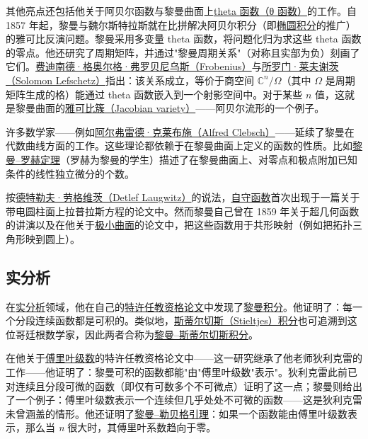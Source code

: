 其他亮点还包括他关于阿贝尔函数与黎曼曲面上\href{https://en.wikipedia.org/wiki/Theta_functions}{theta 函数（θ 函数）}的工作。自 1857 年起，黎曼与魏尔斯特拉斯就在比拼解决阿贝尔积分（即\href{https://en.wikipedia.org/wiki/Elliptic_integrals}{椭圆积分}的推广）的雅可比反演问题。黎曼采用多变量 theta 函数，将问题化归为求这些 theta 函数的零点。他还研究了周期矩阵，并通过"黎曼周期关系"（对称且实部为负）刻画了它们。\href{https://en.wikipedia.org/wiki/Ferdinand_Georg_Frobenius}{费迪南德·格奥尔格·弗罗贝尼乌斯（Frobenius）}与\href{https://en.wikipedia.org/wiki/Solomon_Lefschetz}{所罗门·莱夫谢茨（Solomon Lefschetz）}指出：该关系成立，等价于商空间 {{\(\mathbb{C}^{n}/\Omega\)}{}}（其中 {{\(\Omega\)}{}} 是周期矩阵生成的格）能通过 theta 函数嵌入到一个射影空间中。对于某些 {{\(n\)}{}} 值，这就是黎曼曲面的\href{https://en.wikipedia.org/wiki/Jacobian_variety}{雅可比簇（Jacobian variety）}——阿贝尔流形的一个例子。

许多数学家——例如\href{https://en.wikipedia.org/wiki/Alfred_Clebsch}{阿尔弗雷德·克莱布施（Alfred Clebsch）}——延续了黎曼在代数曲线方面的工作。这些理论都依赖于在黎曼曲面上定义的函数的性质。比如\href{https://en.wikipedia.org/wiki/Riemann–Roch_theorem}{黎曼--罗赫定理}（罗赫为黎曼的学生）描述了在黎曼曲面上、对零点和极点附加已知条件的线性独立微分的个数。

按\href{https://en.wikipedia.org/wiki/Detlef_Laugwitz}{德特勒夫·劳格维茨（Detlef Laugwitz）}的说法，\href{https://en.wikipedia.org/wiki/Automorphic_function}{自守函数}首次出现于一篇关于带电圆柱面上拉普拉斯方程的论文中。然而黎曼自己曾在 1859 年关于超几何函数的讲演以及在他关于\href{https://en.wikipedia.org/wiki/Minimal_surface}{极小曲面}的论文中，把这些函数用于共形映射（例如把拓扑三角形映到圆上）。


\subsection{实分析}\label{Real_analysis}

在\href{https://en.wikipedia.org/wiki/Real_analysis}{实分析}领域，他在自己的\href{https://en.wikipedia.org/wiki/Habilitation}{特许任教资格论文}中发现了\href{https://en.wikipedia.org/wiki/Riemann_integral}{黎曼积分}。他证明了：每一个分段连续函数都是可积的。类似地，\href{https://en.wikipedia.org/wiki/Stieltjes_integral}{斯蒂尔切斯（Stieltjes）积分}也可追溯到这位哥廷根数学家，因此两者合称为\href{https://en.wikipedia.org/wiki/Riemann–Stieltjes_integral}{黎曼--斯蒂尔切斯积分}。

在他关于\href{https://en.wikipedia.org/wiki/Fourier_series}{傅里叶级数}的特许任教资格论文中——这一研究继承了他老师狄利克雷的工作——他证明了：黎曼可积的函数都能"由"傅里叶级数"表示"。狄利克雷此前已对连续且分段可微的函数（即仅有可数多个不可微点）证明了这一点；黎曼则给出了一个例子：傅里叶级数表示一个连续但几乎处处不可微的函数——这是狄利克雷未曾涵盖的情形。他还证明了\href{https://en.wikipedia.org/wiki/Riemann–Lebesgue_lemma}{黎曼--勒贝格引理}：如果一个函数能由傅里叶级数表示，那么当 \emph{n} 很大时，其傅里叶系数趋向于零。


